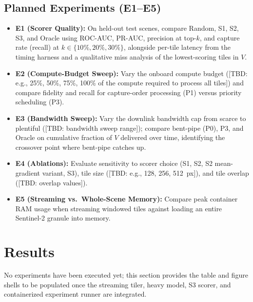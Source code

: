 \documentclass[conference]{IEEEtran}
\begin{document}
\subsection{Planned Experiments (E1--E5)}
\begin{itemize}
    \item \textbf{E1 (Scorer Quality):} On held-out test scenes, compare Random, S1, S2, S3, and Oracle using ROC-AUC, PR-AUC, precision at top-$k$, and capture rate (recall) at $k \in \{10\%, 20\%, 30\%\}$, alongside per-tile latency from the timing harness and a qualitative miss analysis of the lowest-scoring tiles in $V$.
    \item \textbf{E2 (Compute-Budget Sweep):} Vary the onboard compute budget ([TBD: e.g., 25\%, 50\%, 75\%, 100\% of the compute required to process all tiles]) and compare fidelity and recall for capture-order processing (P1) versus priority scheduling (P3).
    \item \textbf{E3 (Bandwidth Sweep):} Vary the downlink bandwidth cap from scarce to plentiful ([TBD: bandwidth sweep range]); compare bent-pipe (P0), P3, and Oracle on cumulative fraction of $V$ delivered over time, identifying the crossover point where bent-pipe catches up.
    \item \textbf{E4 (Ablations):} Evaluate sensitivity to scorer choice (S1, S2, S2 mean-gradient variant, S3), tile size ([TBD: e.g., 128, 256, 512~px]), and tile overlap ([TBD: overlap values]).
    \item \textbf{E5 (Streaming vs.\ Whole-Scene Memory):} Compare peak container RAM usage when streaming windowed tiles against loading an entire Sentinel-2 granule into memory.
\end{itemize}

\section{Results}

No experiments have been executed yet; this section provides the table and figure shells to be populated once the streaming tiler, heavy model, S3 scorer, and containerized experiment runner are integrated.
\end{document}

